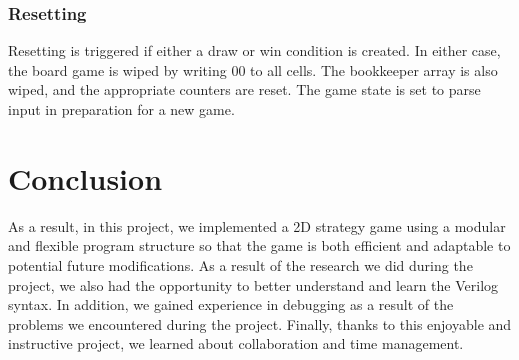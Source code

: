 \documentclass[conference]{IEEEtran}
\begin{document}
\subsubsection{Resetting}
Resetting is triggered if either a draw or win condition is created. In either case, the board game is wiped by writing 00 to all cells. The bookkeeper array is also wiped, and the appropriate counters are reset. The game state is set to parse input in preparation for a new game.
\section{Conclusion}
As a result, in this project, we implemented a 2D strategy game using a modular and flexible program structure so that the game is both efficient and adaptable to potential future modifications. As a result of the research we did during the project, we also had the opportunity to better understand and learn the Verilog syntax. In addition, we gained experience in debugging as a result of the problems we encountered during the project. Finally, thanks to this enjoyable and instructive project, we learned about collaboration and time management.


\end{document}
